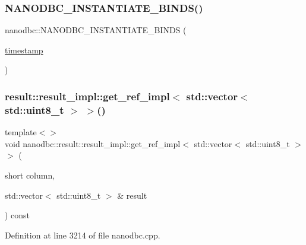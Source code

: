\mbox{\label{namespacenanodbc_a7c4809d9487f6f871beaab2909ddc7e5}} 
\subsubsection{\texorpdfstring{NANODBC\_INSTANTIATE\_BINDS()}{NANODBC\_INSTANTIATE\_BINDS()}\hspace{0.1cm}{\footnotesize\ttfamily [15/15]}}
{\footnotesize\ttfamily nanodbc\+::\+N\+A\+N\+O\+D\+B\+C\+\_\+\+I\+N\+S\+T\+A\+N\+T\+I\+A\+T\+E\+\_\+\+B\+I\+N\+DS (\begin{DoxyParamCaption}\item[{\mbox{\hyperlink{structnanodbc_1_1timestamp}{timestamp}}}]{ }\end{DoxyParamCaption})}

\mbox{\label{namespacenanodbc_ae78e7fd9559120b2a9f51ad76668e5c2}} 
\subsubsection{\texorpdfstring{result::result\_impl::get\_ref\_impl$<$ std::vector$<$ std::uint8\_t $>$ $>$()}{result::result\_impl::get\_ref\_impl< std::vector< std::uint8\_t > >()}}
{\footnotesize\ttfamily template$<$$>$ \\
void nanodbc\+::result\+::result\+\_\+impl\+::get\+\_\+ref\+\_\+impl$<$ std\+::vector$<$ std\+::uint8\+\_\+t $>$ $>$ (\begin{DoxyParamCaption}\item[{short}]{column,  }\item[{std\+::vector$<$ std\+::uint8\+\_\+t $>$ \&}]{result }\end{DoxyParamCaption}) const\hspace{0.3cm}{\ttfamily [inline]}}



Definition at line 3214 of file nanodbc.\+cpp.

